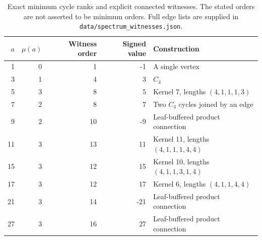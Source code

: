 \begin{table}[htbp]
\centering
\begin{tabular}{rrrrl}
\toprule
$a$ & $\mu(a)$ & Witness order & Signed value & Construction\\\midrule
1 & 0 & 1 & -1 & A single vertex\\
3 & 1 & 4 & 3 & $C_4$\\
5 & 3 & 8 & 5 & Kernel 7, lengths $(4,1,1,1,3)$\\
7 & 2 & 8 & 7 & Two $C_4$ cycles joined by an edge\\
9 & 2 & 10 & -9 & Leaf-buffered product connection\\
11 & 3 & 13 & 11 & Kernel 11, lengths $(4,1,1,1,4,4)$\\
15 & 3 & 12 & 15 & Kernel 10, lengths $(4,1,1,3,1,4)$\\
17 & 3 & 12 & 17 & Kernel 6, lengths $(4,1,1,4,4)$\\
21 & 3 & 14 & -21 & Leaf-buffered product connection\\
27 & 3 & 16 & 27 & Leaf-buffered product connection\\
\bottomrule
\end{tabular}
\caption{Exact minimum cycle ranks and explicit connected witnesses.
The stated orders are not asserted to be minimum orders. Full edge lists
are supplied in \texttt{data/spectrum\_witnesses.json}.}
\label{tab:witnesses}
\end{table}
